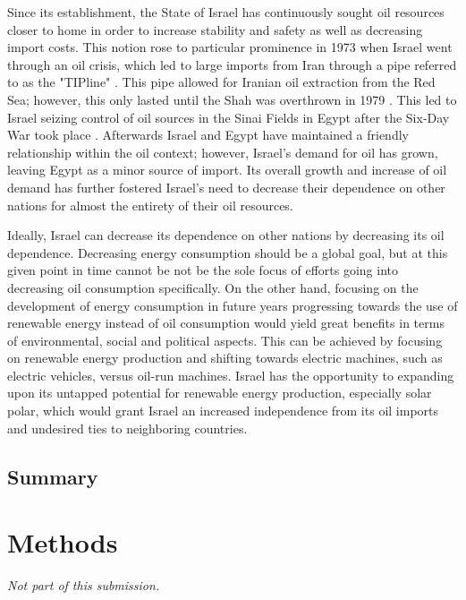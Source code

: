 \documentclass{article}                         %
\begin{document}
    Since its establishment, the State of Israel has continuously sought oil resources closer to home in order to increase stability and safety as well as decreasing import costs. This notion rose to particular prominence in 1973 when Israel went through an oil crisis, which led to large imports from Iran through a pipe referred to as the "TIPline" \cite{Engber2006WhereOil}. This pipe allowed for Iranian oil extraction from the Red Sea; however, this only lasted until the Shah was overthrown in 1979 \cite{Engber2006WhereOil}. This led to Israel seizing control of oil sources in the Sinai Fields in Egypt after the Six-Day War took place \cite{Engber2006WhereOil}.  Afterwards Israel and Egypt have maintained a friendly relationship within the oil context; however, Israel's demand for oil has grown, leaving Egypt as a minor source of import. Its overall growth and increase of oil demand has further fostered Israel's need to decrease their dependence on other nations for almost the entirety of their oil resources. 

	Ideally, Israel can decrease its dependence on other nations by decreasing its oil dependence. Decreasing energy consumption should be a global goal, but at this given point in time cannot be not be the sole focus of efforts going into decreasing oil consumption specifically. On the other hand, focusing on the development of energy consumption in future years progressing towards the use of renewable energy instead of oil consumption would yield great benefits in terms of environmental, social and political aspects. This can be achieved by focusing on renewable energy production and shifting towards electric machines, such as electric vehicles, versus oil-run machines. Israel has the opportunity to expanding upon its untapped potential for renewable energy production, especially solar polar, which would grant Israel an increased independence from its oil imports and undesired ties to neighboring countries. 

\subsection{Summary}

\newpage
\section{Methods}
\textit{Not part of this submission.}

\newpage


\end{document}
